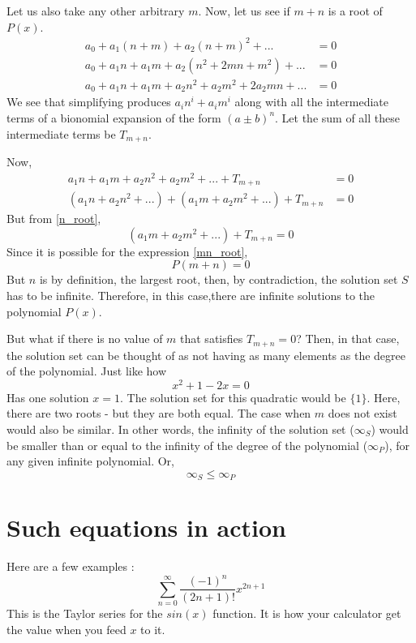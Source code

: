 \documentclass[12pt]{article}
\begin{document}
Let us also take any other arbitrary $m$.
Now, let us see if $m + n$ is a root of $P(x)$.
\begin{align*}
    a_0 + a_1(n + m) + a_2(n + m)^2 + ... &= 0\\
    a_0 + a_1n + a_1m + a_2(n^2 + 2mn + m^2) + ... &= 0\\
    a_0 + a_1n + a_1m + a_2n^2 + a_2m^2 + 2a_2mn + ... &= 0
\end{align*}
We see that simplifying produces $a_in^i + a_im^i$ along with all the intermediate terms of a bionomial expansion of the form $(a \pm b)^n$.
Let the sum of all these intermediate terms be $T_{m + n}$.

Now, 
\begin{align*}
    a_1n + a_1m + a_2n^2 + a_2m^2 + ... + T_{m+n} &= 0\\
    (a_1n + a_2n^2 + ...) + (a_1m + a_2m^2 + ...) + T_{m+n} &= 0
\end{align*}
But from \ref{n_root}, 
\begin{equation} \label{mn_root}
    (a_1m + a_2m^2 + ...) + T_{m+n} = 0
\end{equation}
Since it is possible for the expression \ref{mn_root}, 
\[P(m+n)=0\]
But $n$ is by definition, the largest root, then, by contradiction, the solution set $S$ has to be infinite.
Therefore, in this case,there are infinite solutions to the polynomial $P(x)$.

But what if there is no value of $m$ that satisfies $T_{m+n}=0$? Then, in that case, the solution set can be thought of as not having as many elements as the degree of the polynomial.
Just like how 
\[
    x^2 + 1 - 2x = 0
\]
Has one solution $x=1$.
The solution set for this quadratic would be $\{1\}$.
Here, there are two roots - but they are both equal. The case when $m$ does not exist would also be similar.
In other words, the infinity of the solution set ($\infty_{S}$) would be smaller than or equal to the infinity of the degree of the polynomial ($\infty_{P}$), for any given infinite polynomial.
Or,
\begin{equation}
    \infty_{S} \leqslant \infty_{P}
\end{equation}
\section{Such equations in action}
Here are a few examples :
\[
\sum_{n=0}^{\infty} \dfrac{(-1)^n}{(2n+1)!} x^{2n+1}
\]
This is the Taylor series for the $sin(x)$ function. It is how your calculator get the value when you feed $x$ to it.
\end{document}
